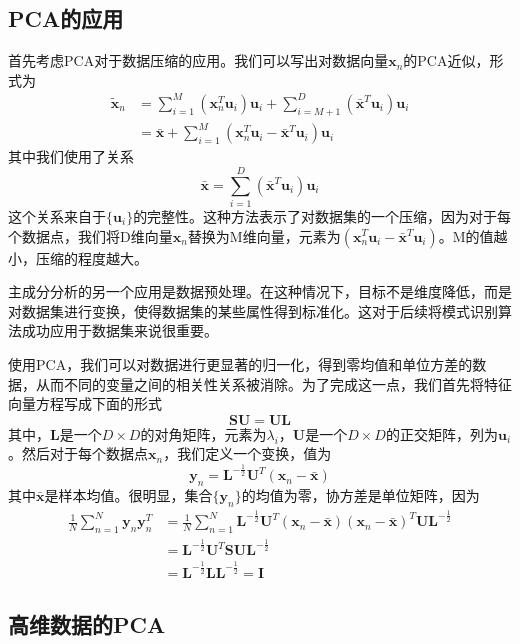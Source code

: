 \subsection*{PCA的应用}
首先考虑PCA对于数据压缩的应用。我们可以写出对数据向量$\boldsymbol{x}_n$的PCA近似，形式为
\begin{equation}
\begin{aligned}
	\tilde{\boldsymbol{x}}_n&=\sum_{i=1}^{M}(\boldsymbol{x}_n^T\boldsymbol{u}_i)\boldsymbol{u}_i+\sum_{i=M+1}^{D}(\bar{\boldsymbol{x}}^T\boldsymbol{u}_i)\boldsymbol{u}_i\\
	&=\bar{\boldsymbol{x}}+\sum_{i=1}^{M}(\boldsymbol{x}_n^T\boldsymbol{u}_i-\bar{\boldsymbol{x}}^T\boldsymbol{u}_i)\boldsymbol{u}_i
\end{aligned}
\end{equation}
其中我们使用了关系
\begin{equation}
	\bar{\boldsymbol{x}}=\sum_{i=1}^{D}(\bar{\boldsymbol{x}}^T\boldsymbol{u}_i)\boldsymbol{u}_i
\end{equation}
这个关系来自于$\{\boldsymbol{u}_i\}$的完整性。这种方法表示了对数据集的一个压缩，因为对于每个数据点，我们将D维向量$\boldsymbol{x}_n$替换为M维向量，元素为$(\boldsymbol{x}_n^T\boldsymbol{u}_i-\bar{\boldsymbol{x}}^T\boldsymbol{u}_i)$。M的值越小，压缩的程度越大。

主成分分析的另一个应用是数据预处理。在这种情况下，目标不是维度降低，而是对数据集进行变换，使得数据集的某些属性得到标准化。这对于后续将模式识别算法成功应用于数据集来说很重要。

使用PCA，我们可以对数据进行更显著的归一化，得到零均值和单位方差的数据，从而不同的变量之间的相关性关系被消除。为了完成这一点，我们首先将特征向量方程写成下面的形式
\begin{equation}
	\boldsymbol{SU}=\boldsymbol{UL}
\end{equation}
其中，$\boldsymbol{L}$是一个$D\times D$的对角矩阵，元素为$\lambda_i$，$\boldsymbol{U}$是一个$D\times D$的正交矩阵，列为$\boldsymbol{u}_i$。然后对于每个数据点$\boldsymbol{x}_n$，我们定义一个变换，值为
\begin{equation}
	\boldsymbol{y}_n=\boldsymbol{L}^{-\frac{1}{2}}\boldsymbol{U}^T(\boldsymbol{x}_n-\bar{\boldsymbol{x}})
\end{equation}
其中$\bar{\boldsymbol{x}}$是样本均值。很明显，集合$\{\boldsymbol{y}_n\}$的均值为零，协方差是单位矩阵，因为
\begin{equation}
	\begin{aligned}
		\frac{1}{N}\sum_{n=1}^{N}\boldsymbol{y}_n\boldsymbol{y}_n^T&=\frac{1}{N}\sum_{n=1}^{N}\boldsymbol{L}^{-\frac{1}{2}}\boldsymbol{U}^T(\boldsymbol{x}_n-\bar{\boldsymbol{x}})(\boldsymbol{x}_n-\bar{\boldsymbol{x}})^T\boldsymbol{UL}^{-\frac{1}{2}}\\
		&=\boldsymbol{L}^{-\frac{1}{2}}\boldsymbol{U}^T\boldsymbol{SUL}^{-\frac{1}{2}}\\
		&=\boldsymbol{L}^{-\frac{1}{2}}\boldsymbol{LL}^{-\frac{1}{2}}=\boldsymbol{I}
	\end{aligned}
\end{equation}
\subsection*{高维数据的PCA}
